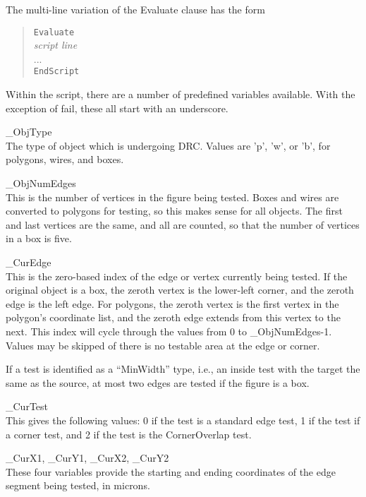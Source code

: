 The multi-line variation of the {\et Evaluate} clause has the form
\begin{quote}
{\tt Evaluate}\\
{\it script line}\\
...\\
{\tt EndScript}
\end{quote}

Within the script, there are a number of predefined variables
available.  With the exception of {\vt fail}, these all start with
an underscore.

\begin{description}
\item{\vt \_ObjType}\\
The type of object which is undergoing DRC.  Values are 'p', 'w', or
'b', for polygons, wires, and boxes.

\item{\vt \_ObjNumEdges}\\
This is the number of vertices in the figure being tested.  Boxes and
wires are converted to polygons for testing, so this makes sense for
all objects.  The first and last vertices are the same, and all are
counted, so that the number of vertices in a box is five.

\item{\vt \_CurEdge}\\
This is the zero-based index of the edge or vertex currently being
tested.  If the original object is a box, the zeroth vertex is the
lower-left corner, and the zeroth edge is the left edge.  For
polygons, the zeroth vertex is the first vertex in the polygon's
coordinate list, and the zeroth edge extends from this vertex to the
next.  This index will cycle through the values from 0 to {\et
\_ObjNumEdges}-1.  Values may be skipped of there is no testable area
at the edge or corner.

If a test is identified as a ``MinWidth'' type, i.e., an inside
test with the target the same as the source, at most two edges are
tested if the figure is a box.

\item{\vt \_CurTest}\\
This gives the following values:  0 if the test is a standard edge
test, 1 if the test if a corner test, and 2 if the test is the {\et
CornerOverlap} test.

\item{\vt \_CurX1, \_CurY1, \_CurX2, \_CurY2}\\
These four variables provide the starting and ending coordinates of
the edge segment being tested, in microns.
\end{description}

